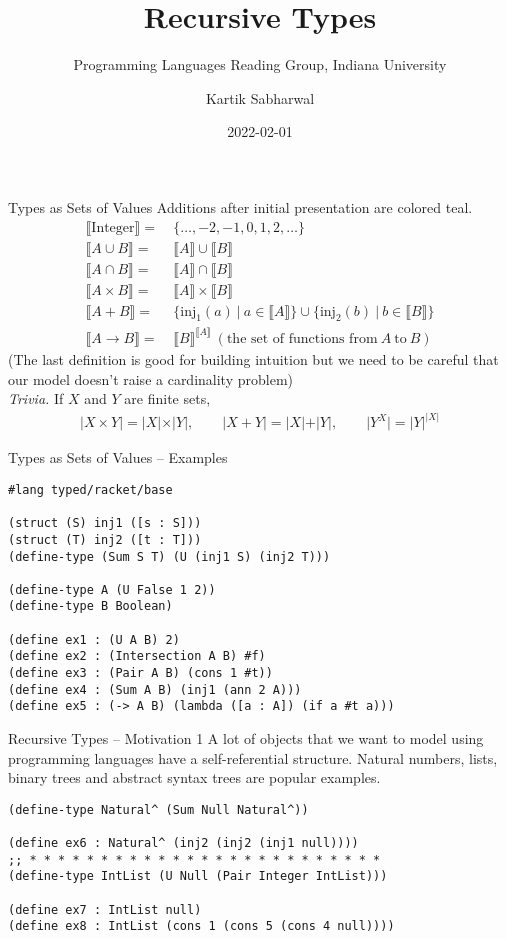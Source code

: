 \documentclass[hyperref={colorlinks = true, urlcolor = blue},pdf]{beamer}
\title{Recursive Types}
\subtitle{Programming Languages Reading Group, Indiana University}
\author{Kartik Sabharwal}
\date{2022-02-01}
\newcommand{\Semantic}[1]{\llbracket {#1} \rrbracket}
\newcommand{\Size}[1]{\vert {#1} \vert}
\begin{document}
\begin{frame}
  \titlepage
\end{frame}
\begin{frame}{Types as Sets of Values}
Additions after initial presentation are colored {\color{teal} teal}.
  \begin{align*}
    \Semantic{\text{Integer}} =\ &
    \{ \ldots, -2, -1, 0, 1, 2, \ldots \} \\
    \Semantic{A \cup B} =\ &
    \Semantic{A} \cup \Semantic{B} \\
    \Semantic{A \cap B} =\ &
    \Semantic{A} \cap \Semantic{B} \\
    \Semantic{A \times B} =\ &
    \Semantic{A} \times \Semantic{B} \\
    \Semantic{A + B} =\ &
    \{ \text{inj}_1(a) \ \vert\ a \in \Semantic{A} \} \cup
    \{ \text{inj}_2(b) \ \vert\ b \in \Semantic{B} \} \\
    \Semantic{A \rightarrow B} =\ &
    \Semantic{B}^{\Semantic{A}}\
    (\text{the set of functions from}\ A\ \text{to}\ B)
  \end{align*}
  {\color{teal}
  (The last definition is good for building intuition but we need to be
  careful that our model doesn't raise a cardinality problem)
  } \\
  \textit{Trivia.} If $X$ and $Y$ are finite sets,
  \begin{align*}
    \Size{X \times Y} = \Size{X} \times \Size{Y},\qquad
    \Size{X + Y} = \Size{X} + \Size{Y}, \qquad
    \Size{Y^X} = {\Size{Y}}^{\Size{X}}
  \end{align*}
\end{frame}
\begin{frame}[fragile]{Types as Sets of Values -- Examples}
\begin{verbatim}
#lang typed/racket/base

(struct (S) inj1 ([s : S]))
(struct (T) inj2 ([t : T]))
(define-type (Sum S T) (U (inj1 S) (inj2 T)))

(define-type A (U False 1 2)) 
(define-type B Boolean)

(define ex1 : (U A B) 2)
(define ex2 : (Intersection A B) #f)
(define ex3 : (Pair A B) (cons 1 #t))
(define ex4 : (Sum A B) (inj1 (ann 2 A)))
(define ex5 : (-> A B) (lambda ([a : A]) (if a #t a)))
\end{verbatim}
\end{frame}
\begin{frame}[fragile]{Recursive Types -- Motivation 1}
  A lot of objects that we want to model using programming languages have a
  self-referential structure. Natural numbers, lists, binary trees and abstract
  syntax trees are popular examples.

\begin{verbatim}
(define-type Natural^ (Sum Null Natural^))

(define ex6 : Natural^ (inj2 (inj2 (inj1 null))))
;; * * * * * * * * * * * * * * * * * * * * * * * * *
(define-type IntList (U Null (Pair Integer IntList)))

(define ex7 : IntList null)
(define ex8 : IntList (cons 1 (cons 5 (cons 4 null))))
\end{verbatim}
\end{frame}
\end{document}
